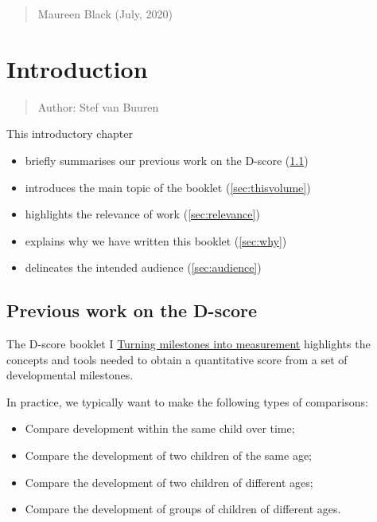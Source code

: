 \documentclass[
]{book}
\providecommand{\tightlist}{%
  \setlength{\itemsep}{0pt}\setlength{\parskip}{0pt}}
\begin{document}
\begin{quote}
Maureen Black (July, 2020)
\end{quote}

\hypertarget{ch:introduction2}{%
\chapter{Introduction}\label{ch:introduction2}}

\begin{quote}
Author: Stef van Buuren
\end{quote}

This introductory chapter

\begin{itemize}
\tightlist
\item
  briefly summarises our previous work on the D-score (\ref{sec:previous})
\item
  introduces the main topic of the booklet (\ref{sec:thisvolume})
\item
  highlights the relevance of work (\ref{sec:relevance})
\item
  explains why we have written this booklet (\ref{sec:why})
\item
  delineates the intended audience (\ref{sec:audience})
\end{itemize}

\hypertarget{sec:previous}{%
\section{Previous work on the D-score}\label{sec:previous}}

The D-score booklet I \href{https://d-score.org/dbook1}{Turning milestones into measurement} highlights the concepts and tools needed to obtain a quantitative score from a set of developmental milestones.

In practice, we typically want to make the following types of comparisons:

\begin{itemize}
\tightlist
\item
  Compare development within the same child over time;
\item
  Compare the development of two children of the same age;
\item
  Compare the development of two children of different ages;
\item
  Compare the development of groups of children of different ages.
\end{itemize}
\end{document}

